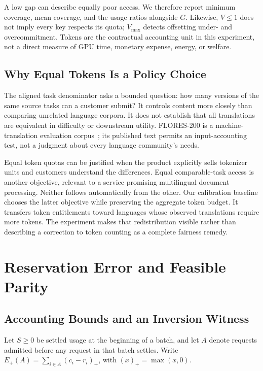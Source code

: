 \documentclass[manuscript,screen]{acmart}
\begin{document}
A low gap can describe equally poor access. We therefore report minimum coverage, mean coverage, and the usage ratios alongside $G$. Likewise, $V\leq1$ does not imply every key respects its quota; $V_{\max}$ detects offsetting under- and overcommitment. Tokens are the contractual accounting unit in this experiment, not a direct measure of GPU time, monetary expense, energy, or welfare.

\subsection{Why Equal Tokens Is a Policy Choice}
The aligned task denominator asks a bounded question: how many versions of the same source tasks can a customer submit? It controls content more closely than comparing unrelated language corpora. It does not establish that all translations are equivalent in difficulty or downstream utility. FLORES-200 is a machine-translation evaluation corpus~\cite{flores,nllb2024}; its published text permits an input-accounting test, not a judgment about every language community's needs.

Equal token quotas can be justified when the product explicitly sells tokenizer units and customers understand the differences. Equal comparable-task access is another objective, relevant to a service promising multilingual document processing. Neither follows automatically from the other. Our calibration baseline chooses the latter objective while preserving the aggregate token budget. It transfers token entitlements toward languages whose observed translations require more tokens. The experiment makes that redistribution visible rather than describing a correction to token counting as a complete fairness remedy.

\section{Reservation Error and Feasible Parity}
\subsection{Accounting Bounds and an Inversion Witness}
Let $S\geq0$ be settled usage at the beginning of a batch, and let $A$ denote requests admitted before any request in that batch settles. Write $E_+(A)=\sum_{i\in A}(c_i-r_i)_+$, with $(x)_+=\max(x,0)$.
\end{document}
